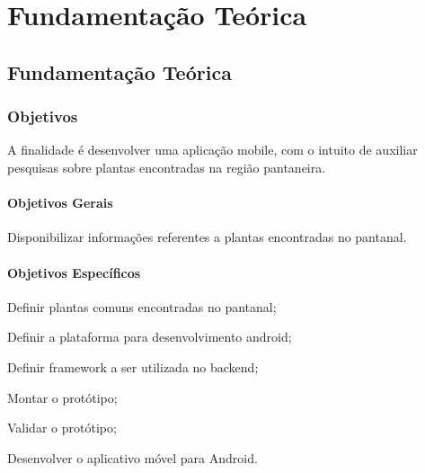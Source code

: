\part{Fundamentação Teórica}

%


\chapter{Fundamentação Teórica}\label{cap_trabalho_academico}


\section{Objetivos}
A finalidade é desenvolver uma aplicação mobile, com o intuito de auxiliar pesquisas sobre plantas encontradas na região pantaneira.

\subsection{Objetivos Gerais}
Disponibilizar informações referentes a plantas encontradas no pantanal.

\subsection{Objetivos Específicos}
Definir plantas comuns encontradas no pantanal;

Definir a plataforma para desenvolvimento android;

Definir framework a ser utilizada no backend;

Montar o protótipo;

Validar o protótipo;

Desenvolver o aplicativo móvel para Android.

